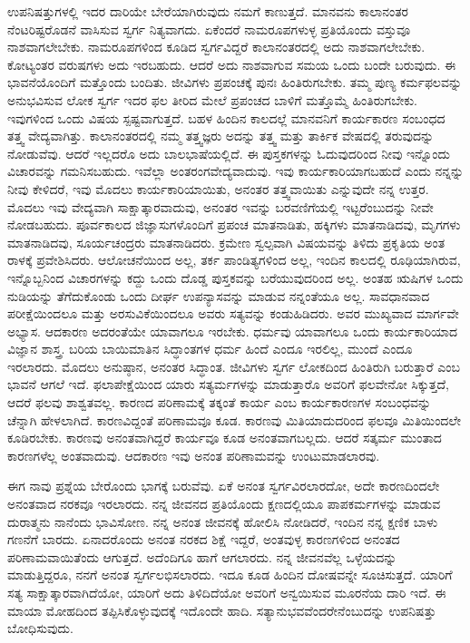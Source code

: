 ಉಪನಿಷತ್ತುಗಳಲ್ಲಿ ಇದರ ದಾರಿಯೇ ಬೇರೆಯಾಗಿರುವುದು ನಮಗೆ ಕಾಣುತ್ತದೆ. ಮಾನವನು ಕಾಲಾನಂತರ ನೆಂಟರಿಷ್ಟರೊಡನೆ ವಾಸಿಸುವ ಸ್ವರ್ಗ ನಿತ್ಯವಾಗದು. ಏಕೆಂದರೆ ನಾಮರೂಪಗಳುಳ್ಳ ಪ್ರತಿಯೊಂದು ವಸ್ತುವೂ ನಾಶವಾಗಲೇಬೇಕು. ನಾಮರೂಪಗಳಿಂದ ಕೂಡಿದ ಸ್ವರ್ಗವಿದ್ದರೆ ಕಾಲಾನಂತರದಲ್ಲಿ ಅದು ನಾಶವಾಗಲೇಬೇಕು. ಕೋಟ್ಯಂತರ ವರುಷಗಳು ಅದು ಇರಬಹುದು. ಆದರೆ ಅದು ನಾಶವಾಗುವ ಸಮಯ ಒಂದು ಬಂದೇ ಬರುವುದು. ಈ ಭಾವನೆಯೊಂದಿಗೆ ಮತ್ತೊಂದು ಬಂದಿತು. ಜೀವಿಗಳು ಪ್ರಪಂಚಕ್ಕೆ ಪುನಃ ಹಿಂತಿರುಗಬೇಕು. ತಮ್ಮ ಪುಣ್ಯ ಕರ್ಮಫಲವನ್ನು ಅನುಭವಿಸುವ ಲೋಕ ಸ್ವರ್ಗ ಇದರ ಫಲ ತೀರಿದ ಮೇಲೆ ಪ್ರಪಂಚದ ಬಾಳಿಗೆ ಮತ್ತೊಮ್ಮೆ ಹಿಂತಿರುಗಬೇಕು. ಇವುಗಳಿಂದ ಒಂದು ವಿಷಯ ಸ್ಪಷ್ಟವಾಗುತ್ತದೆ. ಬಹಳ ಹಿಂದಿನ ಕಾಲದಲ್ಲೆ ಮಾನವನಿಗೆ ಕಾರ್ಯಕಾರಣ ಸಂಬಂಧದ ತತ್ತ್ವ ವೇದ್ಯವಾಗಿತ್ತು. ಕಾಲಾನಂತರದಲ್ಲಿ ನಮ್ಮ ತತ್ತ್ವಜ್ಞರು ಅದನ್ನು ತತ್ತ್ವ ಮತ್ತು ತಾರ್ಕಿಕ ವೇಷದಲ್ಲಿ ತರುವುದನ್ನು ನೋಡುವೆವು. ಆದರೆ ಇಲ್ಲದರೊ ಅದು ಬಾಲಭಾಷೆಯಲ್ಲಿದೆ. ಈ ಪುಸ್ತಕಗಳನ್ನು ಓದುವುದರಿಂದ ನೀವು ಇನ್ನೊಂದು ವಿಚಾರವನ್ನು ಗಮನಿಸಬಹುದು. ಇವೆಲ್ಲಾ ಅಂತರಂಗವೇದ್ಯವಾದುವು. ಇವು ಕಾರ್ಯಕಾರಿಯಾಗಬಹುದೆ ಎಂದು ನನ್ನನ್ನು ನೀವು ಕೇಳಿದರೆ, ಇವು ಮೊದಲು ಕಾರ್ಯಕಾರಿಯಾಯಿತು, ಅನಂತರ ತತ್ತ್ವವಾಯಿತು ಎನ್ನುವುದೇ ನನ್ನ ಉತ್ತರ. ಮೊದಲು ಇವು ವೇದ್ಯವಾಗಿ ಸಾಕ್ಷಾತ್ಕಾರವಾದುವು, ಅನಂತರ ಇವನ್ನು ಬರವಣಿಗೆಯಲ್ಲಿ ಇಟ್ಟರೆಂಬುದನ್ನು ನೀವೇ ನೋಡಬಹುದು. ಪೂರ್ವಕಾಲದ ಜಿಜ್ಞಾಸುಗಳೊಂದಿಗೆ ಪ್ರಪಂಚ ಮಾತನಾಡಿತು, ಹಕ್ಕಿಗಳು ಮಾತನಾಡಿದವು, ಮೃಗಗಳು ಮಾತನಾಡಿದವು, ಸೂರ್ಯಚಂದ್ರರು ಮಾತನಾಡಿದರು. ಕ್ರಮೇಣ ಸ್ವಲ್ಪವಾಗಿ ವಿಷಯವನ್ನು ತಿಳಿದು ಪ್ರಕೃತಿಯ ಅಂತ ರಾಳಕ್ಕೆ ಪ್ರವೇಶಿಸಿದರು. ಆಲೋಚನೆಯಿಂದ ಅಲ್ಲ, ತರ್ಕ ಪಾಂಡಿತ್ಯಗಳಿಂದ ಅಲ್ಲ, ಇಂದಿನ ಕಾಲದಲ್ಲಿ ರೂಢಿಯಾಗಿರುವ, ಇನ್ನೊಬ್ಬನಿಂದ ವಿಚಾರಗಳನ್ನು ಕದ್ದು ಒಂದು ದೊಡ್ಡ ಪುಸ್ತಕವನ್ನು ಬರೆಯುವುದರಿಂದ ಅಲ್ಲ. ಅಂತಹ ಋಷಿಗಳ ಒಂದು ನುಡಿಯನ್ನು ತೆಗೆದುಕೊಂಡು ಒಂದು ದೀರ್ಘ ಉಪನ್ಯಾಸವನ್ನು ಮಾಡುವ ನನ್ನಂತೆಯೂ ಅಲ್ಲ. ಸಾವಧಾನವಾದ ಪರೀಕ್ಷೆಯಿಂದಲೂ ಮತ್ತು ಅರಸುವಿಕೆಯಿಂದಲೂ ಅವರು ಸತ್ಯವನ್ನು ಕಂಡುಹಿಡಿದರು. ಅವರ ಮುಖ್ಯವಾದ ಮಾರ್ಗವೇ ಅಭ್ಯಾಸ. ಆದಕಾರಣ ಅದರಂತೆಯೇ ಯಾವಾಗಲೂ ಇರಬೇಕು. ಧರ್ಮವು ಯಾವಾಗಲೂ ಒಂದು ಕಾರ್ಯಕಾರಿಯಾದ ವಿಜ್ಞಾನ ಶಾಸ್ತ್ರ. ಬರಿಯ ಬಾಯಿಮಾತಿನ ಸಿದ್ಧಾಂತಗಳ ಧರ್ಮ ಹಿಂದೆ ಎಂದೂ ಇರಲಿಲ್ಲ, ಮುಂದೆ ಎಂದೂ ಇರಲಾರದು. ಮೊದಲು ಅನುಷ್ಠಾನ, ಅನಂತರ ಸಿದ್ಧಾಂತ. ಜೀವಿಗಳು ಸ್ವರ್ಗ ಲೋಕದಿಂದ ಹಿಂತಿರುಗಿ ಬರುತ್ತಾರೆ ಎಂಬ ಭಾವನೆ ಆಗಲೆ ಇದೆ. ಫಲಾಪೇಕ್ಷೆಯಿಂದ ಯಾರು ಸತ್ಯರ್ಮಗಳನ್ನು ಮಾಡುತ್ತಾರೊ ಅವರಿಗೆ ಫಲವೇನೋ ಸಿಕ್ಕುತ್ತದೆ, ಆದರೆ ಫಲವು ಶಾಶ್ವತವಲ್ಲ. ಕಾರಣದ ಪರಿಣಾಮಕ್ಕೆ ತಕ್ಕಂತೆ ಕಾರ್ಯ ಎಂಬ ಕಾರ್ಯಕಾರಣಗಳ ಸಂಬಂಧವನ್ನು ಚೆನ್ನಾಗಿ ಹೇಳಲಾಗಿದೆ. ಕಾರಣವಿದ್ದಂತೆ ಪರಿಣಾಮವೂ ಕೂಡ. ಕಾರಣವು ಮಿತಿಯಾದುದರಿಂದ ಫಲವೂ ಮಿತಿಯಿಂದಲೇ ಕೂಡಿರಬೇಕು. ಕಾರಣವು ಅನಂತವಾಗಿದ್ದರೆ ಕಾರ್ಯವೂ ಕೂಡ ಅನಂತವಾಗಬಲ್ಲದು. ಆದರೆ ಸತ್ಕರ್ಮ ಮುಂತಾದ ಕಾರಣಗಳೆಲ್ಲ ಅಂತವಾದುವು. ಆದಕಾರಣ ಇವು ಅನಂತ ಪರಿಣಾಮವನ್ನು ಉಂಟುಮಾಡಲಾರವು. 

\vskip 6pt

ಈಗ ನಾವು ಪ್ರಶ್ನೆಯ ಬೇರೊಂದು ಭಾಗಕ್ಕೆ ಬರುವೆವು. ಏಕೆ ಅನಂತ ಸ್ವರ್ಗವಿರಲಾರದೋ, ಅದೇ ಕಾರಣದಿಂದಲೇ ಅನಂತವಾದ ನರಕವೂ ಇರಲಾರದು. ನನ್ನ ಜೀವನದ ಪ್ರತಿಯೊಂದು ಕ್ಷಣದಲ್ಲಿಯೂ ಪಾಪಕರ್ಮಗಳನ್ನು ಮಾಡುವ ದುರಾತ್ಮನು ನಾನೆಂದು ಭಾವಿಸೋಣ. ನನ್ನ ಅನಂತ ಜೀವನಕ್ಕೆ ಹೋಲಿಸಿ ನೋಡಿದರೆ, ಇಂದಿನ ನನ್ನ ಕ್ಷಣಿಕ ಬಾಳು ಗಣನೆಗೆ ಬಾರದು. ಏನಾದರೊಂದು ಅನಂತ ನರಕದ ಶಿಕ್ಷೆ ಇದ್ದರೆ, ಅಂತವುಳ್ಳ ಕಾರಣಗಳಿಂದ ಅನಂತದ ಪರಿಣಾಮವಾಯಿತೆಂದು ಆಗುತ್ತದೆ. ಅದೆಂದಿಗೂ ಹಾಗೆ ಆಗಲಾರದು. ನನ್ನ ಜೀವನವೆಲ್ಲ ಒಳ್ಳೆಯದನ್ನು ಮಾಡುತ್ತಿದ್ದರೂ, ನನಗೆ ಅನಂತ ಸ್ವರ್ಗಲಭಿಸಲಾರದು. ಇದೂ ಕೂಡ ಹಿಂದಿನ ದೋಷವನ್ನೇ ಸೂಚಿಸುತ್ತದೆ. ಯಾರಿಗೆ ಸತ್ಯ ಸಾಕ್ಷಾತ್ಕಾರವಾಗಿದೆಯೋ, ಯಾರಿಗೆ ಅದು ತಿಳಿದಿದೆಯೋ ಅವರಿಗೆ ಅನ್ವಯಿಸುವ ಮೂರನೆಯ ದಾರಿ ಇದೆ. ಈ ಮಾಯಾ ಮೋಹದಿಂದ ತಪ್ಪಿಸಿಕೊಳ್ಳುವುದಕ್ಕೆ ಇದೊಂದೇ ಹಾದಿ. ಸತ್ಯಾನುಭವವೆಂದರೇನೆಂಬುದನ್ನು ಉಪನಿಷತ್ತು ಬೋಧಿಸುವುದು. 

